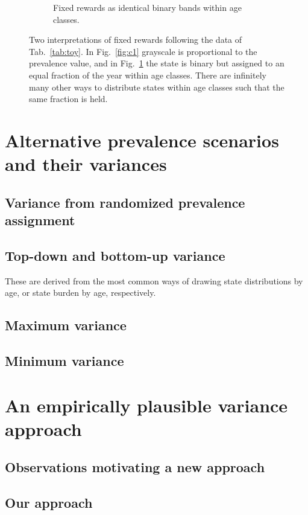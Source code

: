 \documentclass{bmcart}
\begin{document}
\begin{figure}
\begin{subfigure}[b]{0.4\textwidth}
        \caption{Fixed rewards as identical binary bands within age classes.}
        \label{fig:c2}
    \end{subfigure}
    \caption{Two interpretations of fixed rewards following the data of Tab.~\ref{tab:toy}. In Fig.~\ref{fig:c1} grayscale is proportional to the prevalence value, and in Fig.~\ref{fig:c2} the state is binary but assigned to an equal fraction of the year within age classes. There are infinitely many other ways to distribute states within age classes such that the same fraction is held.}
    \label{fig:fixedexplain}
\end{figure}
\FloatBarrier

\section{Alternative prevalence scenarios and their variances}

\subsection{Variance from randomized prevalence assignment}

\subsection{Top-down and bottom-up variance}

These are derived from the most common ways of drawing state distributions by age, or state burden by age, respectively.

\subsection{Maximum variance}

\subsection{Minimum variance}

\section{An empirically plausible variance approach}

\subsection{Observations motivating a new approach}

\subsection{Our approach}
\end{document}
